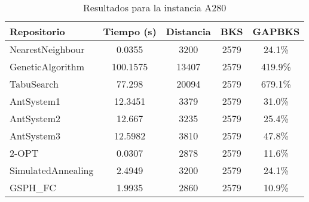 \begin{table}[H]
\centering
\caption{Resultados para la instancia A280}
\begin{tabular}{|l|c|c|c|c|}
\hline
\textbf{Repositorio} & \textbf{Tiempo (s)} & \textbf{Distancia} & \textbf{BKS} & \textbf{GAPBKS} \\ 
\hline
NearestNeighbour & 0.0355 & 3200 & 2579 & 24.1\% \\ 
GeneticAlgorithm & 100.1575 & 13407 & 2579 & 419.9\% \\ 
TabuSearch & 77.298 & 20094 & 2579 & 679.1\% \\ 
AntSystem1 & 12.3451 & 3379 & 2579 & 31.0\% \\ 
AntSystem2 & 12.667 & 3235 & 2579 & 25.4\% \\ 
AntSystem3 & 12.5982 & 3810 & 2579 & 47.8\% \\ 
2-OPT & 0.0307 & 2878 & 2579 & 11.6\% \\ 
SimulatedAnnealing & 2.4949 & 3200 & 2579 & 24.1\% \\ 
GSPH_FC & 1.9935 & 2860 & 2579 & 10.9\% \\ 
\hline
\end{tabular}
\end{table}
